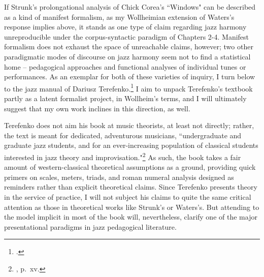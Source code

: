 If Strunk's prolongational analysis of Chick Corea's ``Windows" can be described as a kind of manifest formalism, as my Wollheimian extension of Waters's response implies above, it stands as one type of claim regarding jazz harmony unreproducible under the corpus-syntactic paradigm of Chapters 2-4.  Manifest formalism does not exhaust the space of unreachable claims, however; two other paradigmatic modes of discourse on jazz harmony seem not to find a statistical home -- pedagogical approaches and functional analyses of individual tunes or performances.  As an exemplar for both of these varieties of inquiry, I turn below to the jazz manual of Dariusz Terefenko.\footnote{\cite{terefenko2014}.}  I aim to unpack Terefenko's textbook partly as a latent formalist project, in Wollheim's terms, and I will ultimately suggest that my own work inclines in this direction, as well.

Terefenko does not aim his book at music theorists, at least not directly; rather, the text is meant for dedicated, adventurous musicians, ``undergraduate and graduate jazz students, and for an ever-increasing population of classical students interested in jazz theory and improvisation."\footnote{\cite{terefenko2014}, p.\ xv.}  As such, the book takes a fair amount of western-classical theoretical assumptions as a ground, providing quick primers on scales, meters, triads, and roman numeral analysis designed as reminders rather than explicit theoretical claims.  Since Terefenko presents theory in the service of practice, I will not subject his claims to quite the same critical attention as those in theoretical works like Strunk's or Waters's.  But attending to the model implicit in most of the book will, nevertheless, clarify one of the major presentational paradigms in jazz pedagogical literature.

